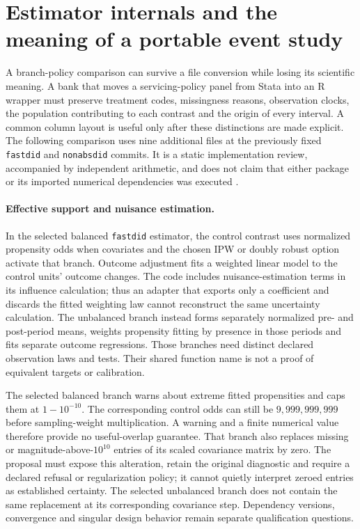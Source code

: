 \section{Estimator internals and the meaning of a portable event study}
\label{sec:exec28-panel-estimator-contracts}

A branch-policy comparison can survive a file conversion while losing its
scientific meaning. A bank that moves a servicing-policy panel from Stata into
an R wrapper must preserve treatment codes, missingness reasons, observation
clocks, the population contributing to each contrast and the origin of every
interval. A common column layout is useful only after these distinctions are
made explicit. The following comparison uses nine additional files at the
previously fixed \texttt{fastdid} and \texttt{nonabsdid} commits. It is a static
implementation review, accompanied by independent arithmetic, and does not
claim that either package or its imported numerical dependencies was executed
\citep{exec28_panel_estimator_sources,exec28_panel_estimator_reference}.

\paragraph{Effective support and nuisance estimation.}
In the selected balanced \texttt{fastdid} estimator, the control contrast uses
normalized propensity odds when covariates and the chosen IPW or doubly robust
option activate that branch. Outcome adjustment fits a weighted linear model
to the control units' outcome changes. The code includes nuisance-estimation
terms in its influence calculation; thus an adapter that exports only a
coefficient and discards the fitted weighting law cannot reconstruct the same
uncertainty calculation. The unbalanced branch instead forms separately
normalized pre- and post-period means, weights propensity fitting by presence
in those periods and fits separate outcome regressions. Those branches need
distinct declared observation laws and tests. Their shared function name is
not a proof of equivalent targets or calibration.

The selected balanced branch warns about extreme fitted propensities and caps
them at $1-10^{-10}$. The corresponding control odds can still be
$9{,}999{,}999{,}999$ before sampling-weight multiplication. A warning and a
finite numerical value therefore provide no useful-overlap guarantee. That
branch also replaces missing or magnitude-above-$10^{10}$ entries of its
scaled covariance matrix by zero. The proposal must expose this alteration,
retain the original diagnostic and require a declared refusal or regularization
policy; it cannot quietly interpret zeroed entries as established certainty.
The selected unbalanced branch does not contain the same replacement at its
corresponding covariance step. Dependency versions, convergence and singular
design behavior remain separate qualification questions.

